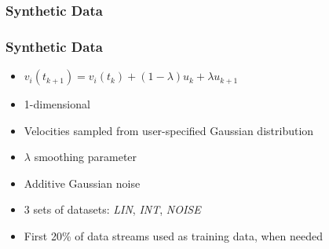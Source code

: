 \documentclass[hyperref={pdfpagelabels=false}]{beamer}
\begin{document}
\subsubsection*{Synthetic Data}
\begin{frame} \frametitle{Synthetic Data}
\begin{itemize}
\item $v_i(t_{k+1})=v_i(t_k) + (1-\lambda)u_{k} + \lambda u_{k+1}$
\item 1-dimensional
\item Velocities sampled from user-specified Gaussian distribution
\item $\lambda$ smoothing parameter
\item Additive Gaussian noise
\item 3 sets of datasets: \emph{LIN}, \emph{INT}, \emph{NOISE}
\item First 20\% of data streams used as training data, when needed
\end{itemize}
\end{frame}
\end{document}
